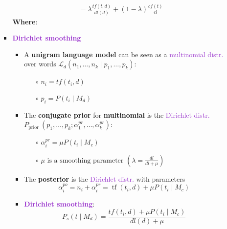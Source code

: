 \begin{enumerate}
\begin{itemize}
\begin{itemize}
$$\begin{aligned}
            &=\lambda \frac{t f(t, d)}{d l(d)}+(1-\lambda) \frac{c f(t)}{c l}
            \end{aligned}
            $$
            \textbf{Where}:
                 \\
            \item \textbf{\textcolor{DarkOrchid}{Dirichlet smoothing}}
            \begin{itemize}
                \item A \textbf{unigram language model} can be seen as a \textcolor{DarkOrchid}{multinomial distr.} over words $\mathcal{L}_{d}\left(n_{1}, \ldots, n_{k} \mid p_{1}, \ldots, p_{k}\right)$:
                \vspace{0.1cm}
                \begin{itemize}
                    \item[$\circ$] $n_i = tf(t_i, d)$
                    \item[$\circ$] $p_i = P(t_i \mid M_d)$ \\
                \end{itemize}
                \item The \textbf{conjugate prior} for \textbf{multinomial} is the \textcolor{DarkOrchid}{Dirichlet distr.} \\ $P_{\text {prior }}\left(p_{1}, \ldots, p_{k} ; \alpha_{1}^{p r}, \ldots, \alpha_{k}^{p r}\right)$:
                \\
                \begin{itemize}
                    \item[$\circ$] $\alpha_{i}^{p r}=\mu P\left(t_{i} \mid M_{c}\right)$ 
                    \item[$\circ$] $\mu \text { is a smoothing parameter }\left(\lambda=\frac{d l}{d l+\mu}\right)$ 
                \end{itemize}
                \item The \textbf{posterior} is the \textcolor{DarkOrchid}{Dirichlet distr.} with parameters  $$\alpha_{i}^{p o}=n_{i}+\alpha_{i}^{p r}=\operatorname{tf}\left(t_{i}, d\right)+\mu P\left(t_{i} \mid M_{c}\right)$$
                \item \textbf{\textcolor{DarkOrchid}{Dirichlet smoothing}}:
                $$
                P_{s}\left(t \mid M_{d}\right)=\frac{t f\left(t_{i}, d\right)+\mu P\left(t_{i} \mid M_{c}\right)}{d l(d)+\mu}
                $$
            \end{itemize}

\end{itemize}
\end{itemize}
\end{enumerate}
